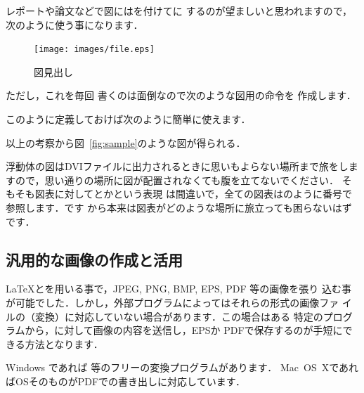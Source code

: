 レポートや論文などで図にはを付けてに
するのが望ましいと思われますので，次のように使う事になります．

\begin{InText}
\begin{figure}[htbp]
 \begin{center}
   \texttt{[image: images/file.eps]}
   \caption{図見出し}\label{fig:samplefig}
 \end{center} 
\end{figure} 
\end{InText}

ただし，これを毎回
書くのは面倒なので次のような図用の命令を
作成します．


このように定義しておけば次のように簡単に使えます．

\begin{InText}
以上の考察から図~\ref{fig:sample}のような図が得られる．
\end{InText}

浮動体の図はDVIファイルに出力されるときに思いもよらない場所まで旅をしま
すので，思い通りの場所に図が配置されなくても腹を立てないでください．
そもそも図表に対してとかという表現
は間違いで，全ての図表はのように番号で参照します．です
から本来は図表がどのような場所に旅立っても困らないはずです．


\subsection{汎用的な画像の作成と活用}

\LaTeX と\Dvipdfmx を用いる事で，JPEG, PNG, BMP, EPS, PDF 等の画像を張り
込む事が可能でした．しかし，外部プログラムによってはそれらの形式の画像ファ
イルの（変換）に対応していない場合があります．この場合はある
特定のプログラムから，に対して画像の内容を送信し，EPSか
PDFで保存するのが手短にできる方法となります．

Windows であれば 等のフリーの変換プログラムがあります．
Mac~OS~XであればOSそのものがPDFでの書き出しに対応しています．%

